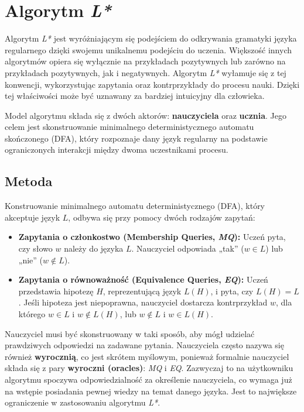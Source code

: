 \chapter{Algorytm \textit{L*}}
\label{cha:l-star}

Algorytm \textit{L*} \cite{L_STAR} jest wyróżniającym się podejściem do odkrywania gramatyki języka regularnego dzięki swojemu unikalnemu podejściu do uczenia. Większość innych algorytmów opiera się wyłącznie na przykładach pozytywnych lub zarówno na przykładach pozytywnych, jak i negatywnych. Algorytm \textit{L*} wyłamuje się z tej konwencji, wykorzystując zapytania oraz kontrprzykłady do procesu nauki. Dzięki tej właściwości może być uznawany za bardziej intuicyjny dla człowieka.

Model algorytmu składa się z dwóch aktorów: \textbf{nauczyciela} oraz \textbf{ucznia}. Jego celem jest skonstruowanie minimalnego deterministycznego automatu skończonego (DFA), który rozpoznaje dany język regularny na podstawie ograniczonych interakcji między dwoma uczestnikami procesu.

\section{Metoda}

Konstruowanie minimalnego automatu deterministycznego (DFA), który akceptuje język \( L \), odbywa się przy pomocy dwóch rodzajów zapytań:
\begin{itemize}
    \item \textbf{Zapytania o członkostwo (Membership Queries, \textit{MQ}):} Uczeń pyta, czy słowo \( w \) należy do języka \( L \). Nauczyciel odpowiada „tak” (\( w \in L \)) lub „nie” (\( w \notin L \)).
    \item \textbf{Zapytania o równoważność (Equivalence Queries, \textit{EQ}):} Uczeń przedstawia hipotezę \( H \), reprezentującą język \( L(H) \), i pyta, czy \( L(H) = L \). Jeśli hipoteza jest niepoprawna, nauczyciel dostarcza kontrprzykład \( w \), dla którego \( w \in L \) i \( w \notin L(H) \), lub \( w \notin L \) i \( w \in L(H) \).
\end{itemize}

Nauczyciel musi być skonstruowany w taki sposób, aby mógł udzielać prawdziwych odpowiedzi na zadawane pytania. Nauczyciela często nazywa się również \textbf{wyrocznią}, co jest skrótem myślowym, ponieważ formalnie nauczyciel składa się z pary \textbf{wyroczni (oracles)}: \textit{MQ} i \textit{EQ}. Zazwyczaj to na użytkowniku algorytmu spoczywa odpowiedzialność za określenie nauczyciela, co wymaga już na wstępie posiadania pewnej wiedzy na temat danego języka. Jest to największe ograniczenie w zastosowaniu algorytmu \textit{L*}.


